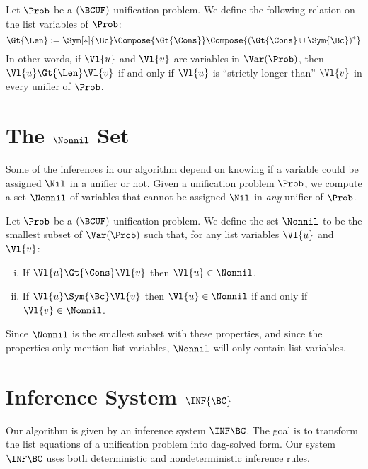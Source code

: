 \begin{Definition}
    Let $\Prob$ be a $(\BCUF)$-unification problem. We define the following
    relation on the list variables of $\Prob$:
    \[ {\Gt{\Len}} := {\Sym[*]{\Bc}} \Compose {\Gt{\Cons}} \Compose
       {({\Gt{\Cons}} \cup {\Sym{\Bc}})^*} \]
    In other words, if $\Vl{u}$ and $\Vl{v}$ are variables in $\Var(\Prob)$,
    then $\Vl{u} \Gt{\Len} \Vl{v}$ if and only if $\Vl{u}$ is ``strictly longer
    than'' $\Vl{v}$ in every unifier of $\Prob$.
\end{Definition}

\section{The $\Nonnil$ Set}

Some of the inferences in our algorithm depend on knowing if a variable could
be assigned $\Nil$ in a unifier or not. Given a unification problem $\Prob$,
we compute a set $\Nonnil$ of variables that cannot be assigned $\Nil$ in
\emph{any} unifier of $\Prob$.

\begin{Definition}
    Let $\Prob$ be a $(\BCUF)$-unification problem. We define the set $\Nonnil$
    to be the smallest subset of $\Var(\Prob)$ such that, for any list variables
    $\Vl{u}$ and $\Vl{v}$:
    \begin{enumerate}[(i)]
        \item If $\Vl{u} \Gt{\Cons} \Vl{v}$ then $\Vl{u} \in \Nonnil$.
        \item If $\Vl{u} \Sym{\Bc} \Vl{v}$ then $\Vl{u} \in \Nonnil$ if and only
            if $\Vl{v} \in \Nonnil$.
    \end{enumerate}

    Since $\Nonnil$ is the smallest subset with these properties, and since the
    properties only mention list variables, $\Nonnil$ will only contain list
    variables.
\end{Definition}

\section{Inference System $\INF{\BC}$}\label{sec:inf-bc}

Our algorithm is given by an inference system $\INF\BC$. The goal is to
transform the list equations of a unification problem into dag-solved form.
Our system $\INF\BC$ uses both deterministic and nondeterministic inference
rules.

